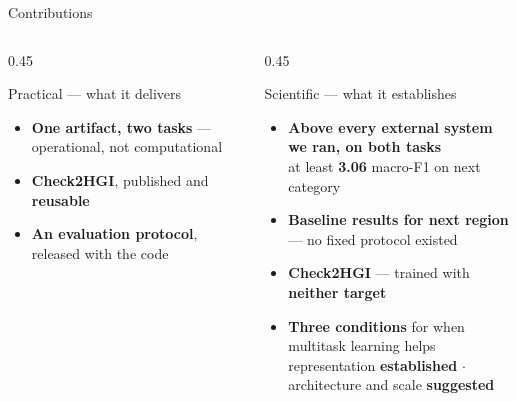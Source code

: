 \documentclass{beamer}
\begin{document}
\begin{frame}{Contributions}
    \vspace{0pt}%
    \begin{columns}[T,onlytextwidth]
    \begin{column}{0.45\textwidth}
        \begin{block}{Practical --- what it delivers}
            {\footnotesize
            \begin{itemize}\setlength{\itemsep}{4pt}\setlength{\parskip}{0pt}
                \item \textbf{One artifact, two tasks} --- \alert{operational, not computational}
                \item \textbf{Check2HGI}, published and \textbf{reusable}
                \item \textbf{An evaluation protocol}, released with the code
            \end{itemize}\par}
        \end{block}
    \end{column}
    \hfill
    \begin{column}{0.45\textwidth}
        \begin{block}{Scientific --- what it establishes}
            {\footnotesize
            \begin{itemize}\setlength{\itemsep}{4pt}\setlength{\parskip}{0pt}
                \item \textbf{Above every external system we ran, on both tasks}\\
                      at least \textbf{3.06} macro-F1 on next category
                \item \textbf{Baseline results for next region} --- no fixed protocol existed
                \item \textbf{Check2HGI} --- trained with \textbf{neither target}
                \item \textbf{Three conditions} for when multitask learning helps\\
                      representation \textbf{established} $\cdot$ architecture and scale
                      \textbf{suggested}
            \end{itemize}\par}
        \end{block}
    \end{column}
    \end{columns}
\end{frame}
\end{document}
